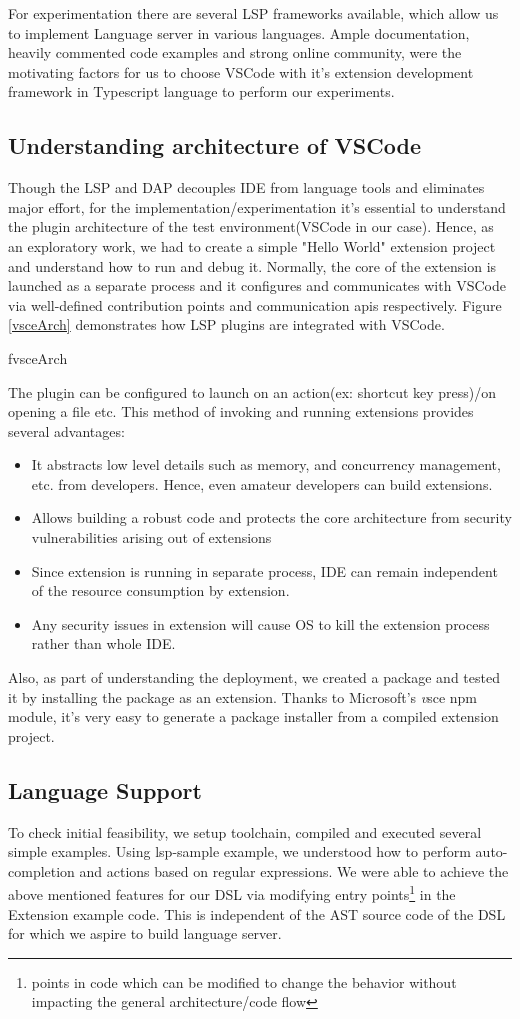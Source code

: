 \documentclass[dvipsnames]{article}
\newcommand{\loadFig}[1]{{%
  \expandafter\let\csname if#1\endcsname\iftrue%
  }
}%
\begin{document}
For experimentation there are several LSP frameworks available, which allow us to implement Language server in various languages.
Ample documentation, heavily commented code examples and strong online community, were the motivating factors for us to choose VSCode with it's extension development framework in Typescript language to perform our experiments.

\subsection{Understanding architecture of VSCode}
Though the LSP and DAP decouples IDE from language tools and eliminates major effort, for the implementation/experimentation it's essential to understand the plugin architecture of the test environment(VSCode in our case).
Hence, as an exploratory work, we had to create a simple "Hello World" extension project and understand how to run and debug it.
Normally, the core of the extension is launched as a separate process and it configures and communicates with VSCode via well-defined contribution points and communication apis respectively.
Figure \ref{vsceArch} demonstrates how LSP plugins are integrated with VSCode.

\loadFig{vsceArch}

The plugin can be configured to launch on an action(ex: shortcut key press)/on opening a file etc.
This method of invoking and running extensions provides several advantages:
\begin{itemize}
\item It abstracts low level details such as memory, and concurrency management, etc. from developers. Hence, even amateur developers can build extensions.
\item Allows building a robust code and protects the core architecture from security vulnerabilities arising out of extensions
\item Since extension is running in separate process, IDE can remain independent of the resource consumption by extension.
\item Any security issues in extension will cause OS to kill the extension process rather than whole IDE.
\end{itemize}
Also, as part of understanding the deployment, we created a package and tested it by installing the package as an extension.
Thanks to Microsoft's {\textit vsce}\cite{vsce} npm module, it's very easy to generate a package installer from a compiled extension project.

\subsection{Language Support}
To check initial feasibility, we setup toolchain, compiled and executed several simple examples.
Using lsp-sample example\cite{vsclspex}, we understood how to perform auto-completion and actions based on regular expressions.
We were able to achieve the above mentioned features for our DSL via modifying entry points\footnote{points in code which can be modified to change the behavior without impacting the general architecture/code flow} in the Extension example code.
This is independent of the AST source code of the DSL for which we aspire to build language server.
\end{document}
